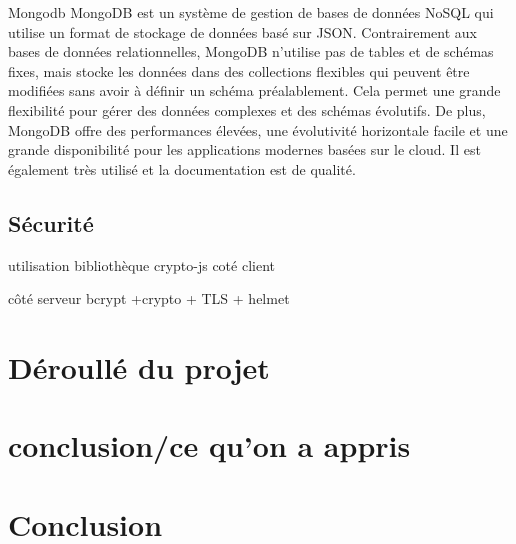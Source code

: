 \documentclass[a4paper,12pt]{report}
\begin{document}
			Mongodb
			MongoDB est un système de gestion de bases de données NoSQL qui utilise un format de stockage de données basé sur JSON. Contrairement aux bases de données relationnelles, MongoDB n'utilise pas de tables et de schémas fixes, mais stocke les données dans des collections flexibles qui peuvent être modifiées sans avoir à définir un schéma préalablement. Cela permet une grande flexibilité pour gérer des données complexes et des schémas évolutifs. De plus, MongoDB offre des performances élevées, une évolutivité horizontale facile et une grande disponibilité pour les applications modernes basées sur le cloud.  
  Il est également très utilisé et la documentation est de qualité.
			
			\section{Sécurité}
			
			utilisation bibliothèque crypto-js coté client
			
			côté serveur bcrypt +crypto + TLS + helmet
			
			\chapter{Déroullé du projet}
			
			\chapter{conclusion/ce qu'on a appris}
			
			\chapter{Conclusion}

			
\end{document}
